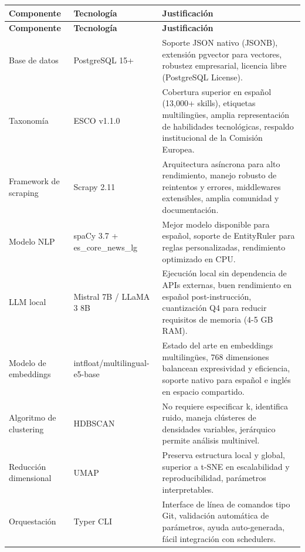 \begin{longtable}{|p{3.5cm}|p{3.5cm}|p{7cm}|}
\hline
\textbf{Componente} & \textbf{Tecnología} & \textbf{Justificación} \\
\hline
\endfirsthead

\hline
\textbf{Componente} & \textbf{Tecnología} & \textbf{Justificación} \\
\hline
\endhead

\hline
\endfoot

\hline
\endlastfoot

Base de datos & PostgreSQL 15+ & Soporte JSON nativo (JSONB), extensión pgvector para vectores, robustez empresarial, licencia libre (PostgreSQL License). \\
\hline

Taxonomía & ESCO v1.1.0 & Cobertura superior en español (13,000+ skills), etiquetas multilingües, amplia representación de habilidades tecnológicas, respaldo institucional de la Comisión Europea. \\
\hline

Framework de scraping & Scrapy 2.11 & Arquitectura asíncrona para alto rendimiento, manejo robusto de reintentos y errores, middlewares extensibles, amplia comunidad y documentación. \\
\hline

Modelo NLP & spaCy 3.7 + es\_core\_news\_lg & Mejor modelo disponible para español, soporte de EntityRuler para reglas personalizadas, rendimiento optimizado en CPU. \\
\hline

LLM local & Mistral 7B / LLaMA 3 8B & Ejecución local sin dependencia de APIs externas, buen rendimiento en español post-instrucción, cuantización Q4 para reducir requisitos de memoria (4-5 GB RAM). \\
\hline

Modelo de embeddings & intfloat/multilingual-e5-base & Estado del arte en embeddings multilingües, 768 dimensiones balancean expresividad y eficiencia, soporte nativo para español e inglés en espacio compartido. \\
\hline

Algoritmo de clustering & HDBSCAN & No requiere especificar k, identifica ruido, maneja clústeres de densidades variables, jerárquico permite análisis multinivel. \\
\hline

Reducción dimensional & UMAP & Preserva estructura local y global, superior a t-SNE en escalabilidad y reproducibilidad, parámetros interpretables. \\
\hline

Orquestación & Typer CLI & Interface de línea de comandos tipo Git, validación automática de parámetros, ayuda auto-generada, fácil integración con schedulers. \\
\hline

\end{longtable}

